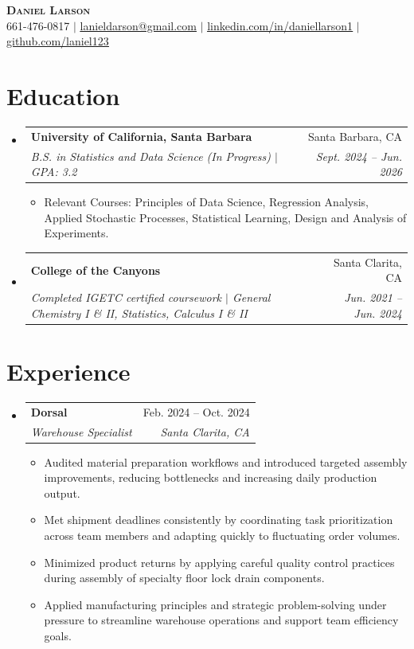\documentclass[letterpaper,11pt]{article}
\makeatletter
\newcommand{\resumeItem}[1]{
  \item\small{
    {#1 \vspace{-2pt}}
  }
}
\newcommand{\resumeSubheading}[4]{
  \vspace{-2pt}\item
    \begin{tabular*}{0.97\textwidth}[t]{l@{\extracolsep{\fill}}r}
      \textbf{#1} & #2 \\
      \textit{\small#3} & \textit{\small #4} \\
    \end{tabular*}\vspace{-7pt}
}
\newcommand{\resumeSubHeadingListStart}{\begin{itemize}[leftmargin=0.15in, label={}]}
\newcommand{\resumeSubHeadingListEnd}{\end{itemize}}
\newcommand{\resumeItemListStart}{\begin{itemize}}
\newcommand{\resumeItemListEnd}{\end{itemize}\vspace{-5pt}}
\makeatother
\begin{document}
 
\begin{center}
    \textbf{\Huge \scshape Daniel Larson} \\ \vspace{1pt}
    \small 661-476-0817 $|$ \href{mailto:lanieldarson@gmail.com}{\underline{lanieldarson@gmail.com}} $|$
    \href{https://www.linkedin.com/in/daniellarson1}{\underline{linkedin.com/in/daniellarson1}} $|$
    \href{https://github.com/laniel123}{\underline{github.com/laniel123}}
\end{center}
 
\section{Education}
  \resumeSubHeadingListStart
    \resumeSubheading
      {University of California, Santa Barbara}{Santa Barbara, CA}
      {B.S. in Statistics and Data Science (In Progress) $|$ GPA: 3.2}{Sept. 2024 -- Jun. 2026}
      \resumeItemListStart
        \resumeItem{Relevant Courses: Principles of Data Science, Regression Analysis, Applied Stochastic Processes, Statistical Learning, Design and Analysis of Experiments.}
      \resumeItemListEnd
      \resumeSubheading
      {College of the Canyons}{Santa Clarita, CA}
      {Completed IGETC certified coursework $|$ General Chemistry I \& II, Statistics, Calculus I \& II}{Jun. 2021 -- Jun. 2024}
      \resumeSubHeadingListEnd
 
\section{Experience}
  \resumeSubHeadingListStart
    \resumeSubheading
      {Dorsal}{Feb. 2024 -- Oct. 2024}
      {Warehouse Specialist}{Santa Clarita, CA}
      \resumeItemListStart
      \resumeItem{Audited material preparation workflows and introduced targeted assembly improvements, reducing bottlenecks and increasing daily production output.}
      \resumeItem{Met shipment deadlines consistently by coordinating task prioritization across team members and adapting quickly to fluctuating order volumes.}
      \resumeItem{Minimized product returns by applying careful quality control practices during assembly of specialty floor lock drain components.}
      \resumeItem{Applied manufacturing principles and strategic problem-solving under pressure to streamline warehouse operations and support team efficiency goals.}
      \resumeItemListEnd
      \resumeSubHeadingListEnd
 
\end{document}
